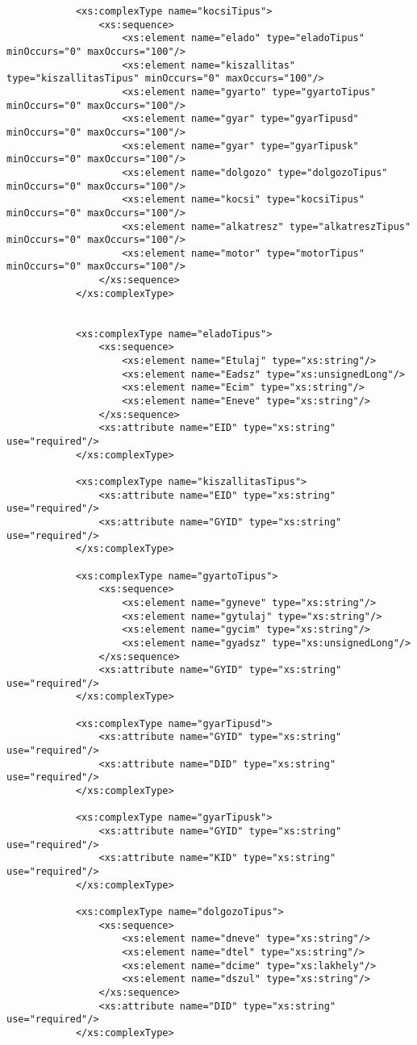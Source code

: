 \documentclass[14pt]{extarticle}
\begin{document}
\begin{normalsize}
\begin{verbatim}
			<xs:complexType name="kocsiTipus">
				<xs:sequence>
					<xs:element name="elado" type="eladoTipus" minOccurs="0" maxOccurs="100"/> 
					<xs:element name="kiszallitas" type="kiszallitasTipus" minOccurs="0" maxOccurs="100"/>
					<xs:element name="gyarto" type="gyartoTipus" minOccurs="0" maxOccurs="100"/>
					<xs:element name="gyar" type="gyarTipusd" minOccurs="0" maxOccurs="100"/>
                    <xs:element name="gyar" type="gyarTipusk" minOccurs="0" maxOccurs="100"/>
					<xs:element name="dolgozo" type="dolgozoTipus" minOccurs="0" maxOccurs="100"/>
					<xs:element name="kocsi" type="kocsiTipus" minOccurs="0" maxOccurs="100"/>
					<xs:element name="alkatresz" type="alkatreszTipus" minOccurs="0" maxOccurs="100"/>
					<xs:element name="motor" type="motorTipus" minOccurs="0" maxOccurs="100"/>
				</xs:sequence>
			</xs:complexType>
		
			
			<xs:complexType name="eladoTipus">
				<xs:sequence>
					<xs:element name="Etulaj" type="xs:string"/>
					<xs:element name="Eadsz" type="xs:unsignedLong"/>
					<xs:element name="Ecim" type="xs:string"/>
                    <xs:element name="Eneve" type="xs:string"/>
				</xs:sequence>
				<xs:attribute name="EID" type="xs:string" use="required"/> 
			</xs:complexType>
			
			<xs:complexType name="kiszallitasTipus">
				<xs:attribute name="EID" type="xs:string" use="required"/> 
				<xs:attribute name="GYID" type="xs:string" use="required"/>
			</xs:complexType>
			
			<xs:complexType name="gyartoTipus">
				<xs:sequence>
					<xs:element name="gyneve" type="xs:string"/>
					<xs:element name="gytulaj" type="xs:string"/>
                    <xs:element name="gycim" type="xs:string"/>
					<xs:element name="gyadsz" type="xs:unsignedLong"/>
				</xs:sequence>
                <xs:attribute name="GYID" type="xs:string" use="required"/>
			</xs:complexType>
			
			<xs:complexType name="gyarTipusd">
				<xs:attribute name="GYID" type="xs:string" use="required"/> 
				<xs:attribute name="DID" type="xs:string" use="required"/>
			</xs:complexType>

            <xs:complexType name="gyarTipusk">
				<xs:attribute name="GYID" type="xs:string" use="required"/> 
				<xs:attribute name="KID" type="xs:string" use="required"/>
			</xs:complexType>
			
			<xs:complexType name="dolgozoTipus">
				<xs:sequence>
					<xs:element name="dneve" type="xs:string"/>
					<xs:element name="dtel" type="xs:string"/>
					<xs:element name="dcime" type="xs:lakhely"/>
					<xs:element name="dszul" type="xs:string"/>
				</xs:sequence>
				<xs:attribute name="DID" type="xs:string" use="required"/> 
			</xs:complexType>


\end{verbatim}
\end{normalsize}
\end{document}
